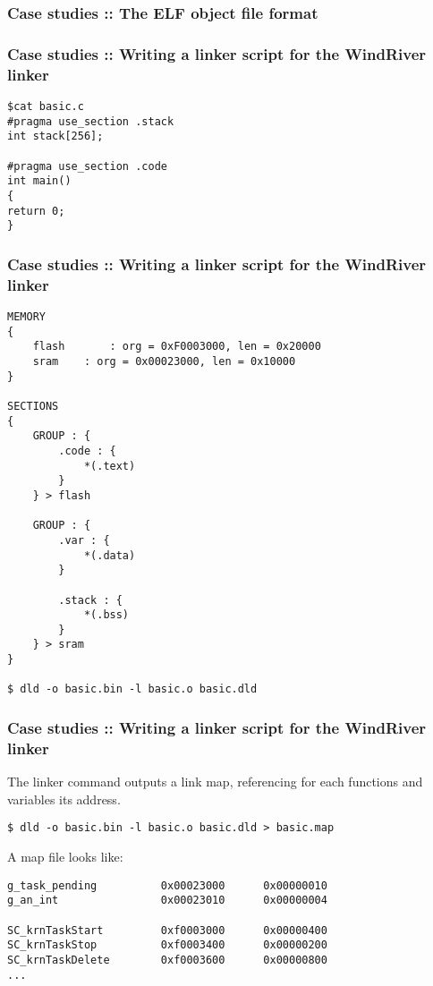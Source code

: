 
\begin{frame}
  \frametitle{Case studies :: The ELF object file format}


 \begin{center}
  \end{center}


\end{frame}


\begin{frame}[containsverbatim]
  \frametitle{Case studies :: Writing a linker script for the WindRiver linker}
 
\begin{verbatim}
$cat basic.c
#pragma use_section .stack
int stack[256];

#pragma use_section .code
int main()
{
return 0;
}
\end{verbatim}

\end{frame}


\begin{frame}[containsverbatim]
  \frametitle{Case studies :: Writing a linker script for the WindRiver linker}
 
\begin{verbatim}
MEMORY
{
    flash     	: org = 0xF0003000, len = 0x20000 
    sram	: org = 0x00023000, len = 0x10000
}

SECTIONS
{            
	GROUP : {
		.code : {
			*(.text)
		}
	} > flash

	GROUP : {
		.var : {
			*(.data)
		}

		.stack : {
			*(.bss)
		}
	} > sram
}

$ dld -o basic.bin -l basic.o basic.dld
\end{verbatim}

\end{frame}


\begin{frame}[containsverbatim]
  \frametitle{Case studies :: Writing a linker script for the WindRiver linker}
 
The linker command outputs a link map, referencing for each functions and variables its address.

\begin{verbatim}
$ dld -o basic.bin -l basic.o basic.dld > basic.map
\end{verbatim}

A map file looks like:

\begin{verbatim}
g_task_pending          0x00023000      0x00000010
g_an_int                0x00023010      0x00000004

SC_krnTaskStart         0xf0003000      0x00000400
SC_krnTaskStop          0xf0003400      0x00000200
SC_krnTaskDelete        0xf0003600      0x00000800
...
\end{verbatim}
\end{frame}



